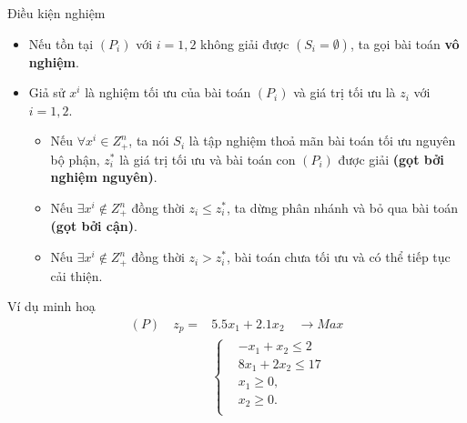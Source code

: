 \documentclass{beamer}
\begin{document}
\begin{frame}{Điều kiện nghiệm}
\begin{itemize}
\item Nếu tồn tại $(P_i)$ với $i=1,2$ không giải được $(S_i = \emptyset )$, ta gọi bài toán \textbf{vô nghiệm}.
\item Giả sử $x^i$ là nghiệm tối ưu của bài toán $(P_i)$ và giá trị tối ưu là $z_i$ với $i = 1,2$.
\begin{itemize}
\item Nếu $\forall x^i \in Z^n_+$, ta nói $S_i$ là tập nghiệm thoả mãn bài toán tối ưu nguyên bộ phận, $z^*_i$ là giá trị tối ưu và bài toán con $(P_i)$ được giải \textbf{(gọt bởi nghiệm nguyên)}.
\item Nếu $\exists x^i \notin Z^n_+$ đồng thời $z_i \leq z^*_i$, ta dừng phân nhánh và bỏ qua bài toán \textbf{(gọt bởi cận)}.
\item Nếu $\exists x^i \notin Z^n_+$ đồng thời $z_i > z^*_i$, bài toán chưa tối ưu và có thể tiếp tục cải thiện.
\iffalse
Với $x^i_{j^'}$ là nghiệm không nguyên và phân thành 2 bài toán con $P_3$ với tập nghiệm $S_l := S_i \cap \{ (x,y): x_{j^{'}} \leq \lfloor x_{j^{'}} \rfloor \}$, $P_l$ với $S_l := S_i \cap \{ (x,y): x_{j^{'}} \geq \lceil x_{j^{'}} \rceil \}$ trong đó $l=3,4$ và lặp lại quá trình.
\fi
\end{itemize}
\end{itemize}
\end{frame}

\begin{frame}{Ví dụ minh hoạ}
    \begin{equation*}
        \begin{split}
            (P) \quad z_p= & 5.5x_1 + 2.1x_2 \quad \longrightarrow Max \\
            & \left\{\begin{split}
            & -x_1 + x_2 \leq 2 \\
            & 8x_1 + 2x_2 \leq 17 \\
            &x_1 \geq 0, \\
            &x_2 \geq 0. \\
            \end{split}\right. \\
        \end{split}
    \end{equation*}
\end{frame}
\end{document}
